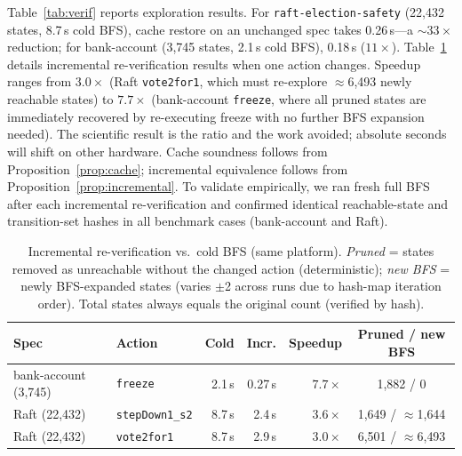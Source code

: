 \documentclass[runningheads]{llncs}
\begin{document}
Table~\ref{tab:verif} reports exploration results.
For \texttt{raft-election-safety} (22{,}432 states, 8.7\,s cold BFS),
cache restore on an unchanged spec takes 0.26\,s---a ${\sim}33\times$
reduction; for bank-account (3{,}745 states, 2.1\,s cold BFS), 0.18\,s
($11\times$).
Table~\ref{tab:incr} details incremental re-verification results when one
action changes.
Speedup ranges from $3.0\times$ (Raft \texttt{vote2for1}, which must
re-explore ${\approx}$6{,}493 newly reachable states) to $7.7\times$ (bank-account
\texttt{freeze}, where all pruned states are immediately recovered by
re-executing freeze with no further BFS expansion needed).
The scientific result is the ratio and the work avoided; absolute seconds
will shift on other hardware.
Cache soundness follows from Proposition~\ref{prop:cache};
incremental equivalence follows from Proposition~\ref{prop:incremental}.
To validate empirically, we ran fresh full BFS after each incremental
re-verification and confirmed identical reachable-state and transition-set
hashes in all benchmark cases (bank-account and Raft).

\begin{table}[t]
\caption{Incremental re-verification vs.\ cold BFS (same platform).
  \emph{Pruned} = states removed as unreachable without the changed action
  (deterministic); \emph{new BFS} = newly BFS-expanded states (varies $\pm$2
  across runs due to hash-map iteration order).
  Total states always equals the original count (verified by hash).}\label{tab:incr}
\centering
\small
\begin{tabular}{llrrrc}
\toprule
Spec & Action & Cold & Incr. & Speedup & Pruned / new BFS \\
\midrule
bank-account (3{,}745) & \texttt{freeze}         & 2.1\,s & 0.27\,s & $7.7\times$ & 1{,}882 / 0 \\
Raft (22{,}432)        & \texttt{stepDown1\_s2}  & 8.7\,s & 2.4\,s  & $3.6\times$ & 1{,}649 / ${\approx}$1{,}644 \\
Raft (22{,}432)        & \texttt{vote2for1}      & 8.7\,s & 2.9\,s  & $3.0\times$ & 6{,}501 / ${\approx}$6{,}493 \\
\bottomrule
\end{tabular}
\end{table}
\end{document}
